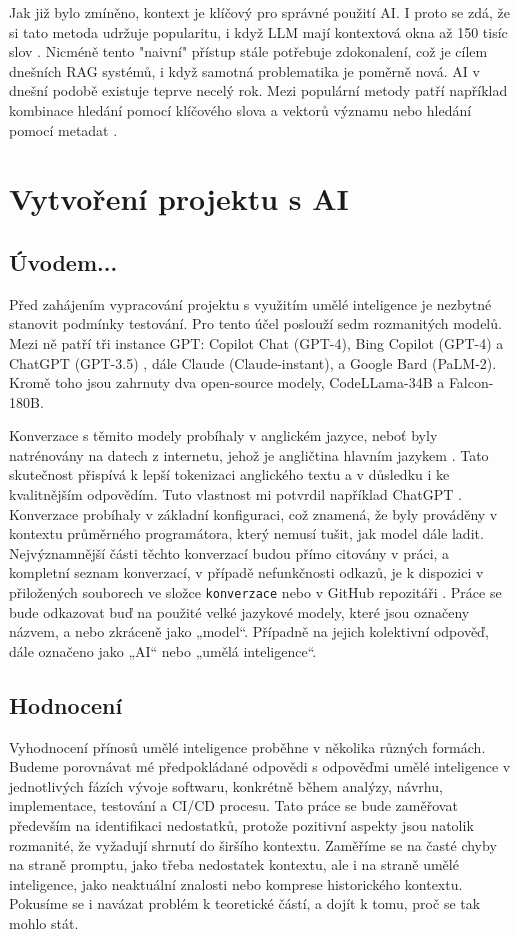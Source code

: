 \documentclass[FM,DP]{tulthesis}
\begin{document}
		Jak již bylo zmíněno, kontext je klíčový pro správné použití AI. I proto se zdá, že si tato metoda udržuje popularitu, i když LLM mají kontextová okna až 150 tisíc slov \cite{paper:RAG}. Nicméně tento "naivní" přístup stále potřebuje zdokonalení, což je cílem dnešních RAG systémů, i když samotná problematika je poměrně nová. AI v dnešní podobě existuje teprve necelý rok. Mezi populární metody patří například kombinace hledání pomocí klíčového slova a vektorů významu nebo hledání pomocí metadat \cite{paper:RAG}.
		
		\chapter{Vytvoření projektu s AI}
		\section{Úvodem...}
		Před zahájením vypracování projektu s využitím umělé inteligence je nezbytné stanovit podmínky testování. Pro tento účel poslouží sedm rozmanitých modelů. Mezi ně patří tři instance GPT: Copilot Chat (GPT-4), Bing Copilot (GPT-4) a ChatGPT (GPT-3.5) , dále Claude (Claude-instant), a Google Bard (PaLM-2). Kromě toho jsou zahrnuty dva open-source modely, CodeLLama-34B a Falcon-180B.
		
		Konverzace s těmito modely probíhaly v anglickém jazyce, neboť byly natrénovány na datech z internetu, jehož je angličtina hlavním jazykem \cite{internetLanguages}. Tato skutečnost přispívá k lepší tokenizaci anglického textu a v důsledku i ke kvalitnějším odpovědím. Tuto vlastnost mi potvrdil například ChatGPT \cite{chatgpt_jazyk}. Konverzace probíhaly v základní konfiguraci, což znamená, že byly prováděny v kontextu průměrného programátora, který nemusí tušit, jak model dále ladit. Nejvýznamnější části těchto konverzací budou přímo citovány v práci, a kompletní seznam konverzací, v případě nefunkčnosti odkazů, je k dispozici v přiložených souborech ve složce \verb|konverzace| nebo v GitHub repozitáři \cite{promptsRepo}. Práce se bude odkazovat buď na použité velké jazykové modely, které jsou označeny názvem, a nebo zkráceně jako „model“. Případně na jejich kolektivní odpověď, dále označeno jako „AI“ nebo „umělá inteligence“.
		
		\section{Hodnocení}
		Vyhodnocení přínosů umělé inteligence proběhne v několika různých formách. Budeme porovnávat mé předpokládané odpovědi s odpověďmi umělé inteligence v jednotlivých fázích vývoje softwaru, konkrétně během analýzy, návrhu, implementace, testování a CI/CD procesu. Tato práce se bude zaměřovat především na identifikaci nedostatků, protože pozitivní aspekty jsou natolik rozmanité, že vyžadují shrnutí do širšího kontextu. Zaměříme se na časté chyby na straně promptu, jako třeba nedostatek kontextu, ale i na straně umělé inteligence, jako neaktuální znalosti nebo komprese historického kontextu. Pokusíme se i navázat problém k teoretické částí, a dojít k tomu, proč se tak mohlo stát.
		
\end{document}
